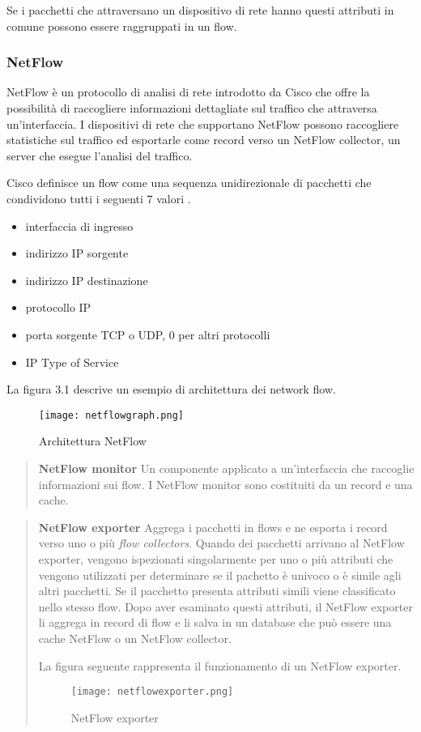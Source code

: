\documentclass[../main.tex]{subfiles}
\begin{document}
Se i pacchetti che attraversano un dispositivo di rete hanno questi attributi in comune possono essere raggruppati in un flow.

\subsubsection{NetFlow}
NetFlow è un protocollo di analisi di rete introdotto da Cisco che offre la possibilità di raccogliere informazioni dettagliate sul traffico che attraversa un'interfaccia. I dispositivi di rete che supportano NetFlow possono raccogliere statistiche sul traffico ed esportarle come record verso un NetFlow collector, un server che esegue l'analisi del traffico.

Cisco definisce un flow come una sequenza unidirezionale di pacchetti che condividono tutti i seguenti 7 valori \cite{netflowDef}.

\begin{itemize}
				\item interfaccia di ingresso
				\item indirizzo IP sorgente
				\item indirizzo IP destinazione
				\item protocollo IP
				\item porta sorgente TCP o UDP, 0 per altri protocolli
				\item IP Type of Service
\end{itemize}

La figura 3.1 descrive un esempio di architettura dei network flow. 

\begin{figure}[H]
\centering
\texttt{[image: netflowgraph.png]}
\caption{Architettura NetFlow}
\end{figure}

\begin{verse}
\textbf{NetFlow monitor}
Un componente applicato a un'interfaccia che raccoglie informazioni sui flow. I NetFlow monitor sono costituiti da un record e una cache.
\end{verse}

\begin{verse}
\textbf{NetFlow exporter}
Aggrega i pacchetti in flows e ne esporta i record verso uno o più \textit{flow collectors}.
Quando dei pacchetti arrivano al NetFlow exporter, vengono ispezionati singolarmente per uno o più attributi che vengono utilizzati per determinare se il pachetto è univoco o è simile agli altri pacchetti. Se il pacchetto presenta attributi simili viene classificato nello stesso flow.
Dopo aver esaminato questi attributi, il NetFlow exporter li aggrega in record di flow e li salva in un database che può essere una cache NetFlow o un NetFlow collector. 

La figura seguente rappresenta il funzionamento di un NetFlow exporter.

\begin{figure}[H]
\centering
\texttt{[image: netflowexporter.png]}
\caption{NetFlow exporter}
\end{figure}

\end{verse}
\end{document}
